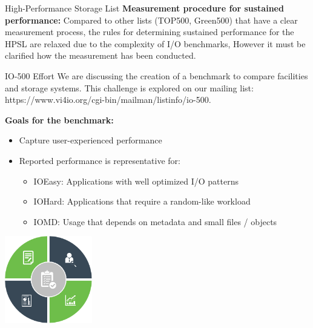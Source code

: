 \documentclass[portrait,a0paper,fontscale=0.4]{baposter}
\begin{document}
\begin{poster}
\begin{posterbox}[name=schedule,column=1,span=2, below=concept]{High-Performance Storage List}
\textbf{Measurement procedure for sustained performance:}
Compared to other lists (TOP500, Green500) that have a clear measurement process, the rules for determining sustained performance for the HPSL are relaxed due to the complexity of I/O benchmarks, However it must be clarified how the measurement has been conducted.
\end{posterbox}

\begin{posterbox}[name=HHCC,column=1,span=2, below=schedule, above=bottom]{IO-500 Effort}
We are discussing the creation of a benchmark to compare facilities and storage systems. This challenge is explored on our mailing list: https://www.vi4io.org/cgi-bin/mailman/listinfo/io-500. 

\textbf{Goals for the benchmark:}

\vspace*{-1em}

\begin{minipage}{10.5cm}
\begin{itemize}
\item Capture user-experienced performance %
\item Reported performance is representative for:
\begin{itemize}
\item IOEasy: Applications with well optimized I/O patterns
\item IOHard: Applications that require a random-like workload
\item IOMD: Usage that depends on metadata and small files / objects
\end{itemize}
\end{itemize}
\end{minipage}
\qquad
\begin{minipage}{4cm}
\includegraphics[width=3.8cm]{border}
\end{minipage}

\vspace*{-1em}


\end{posterbox}
\end{poster}
\end{document}
